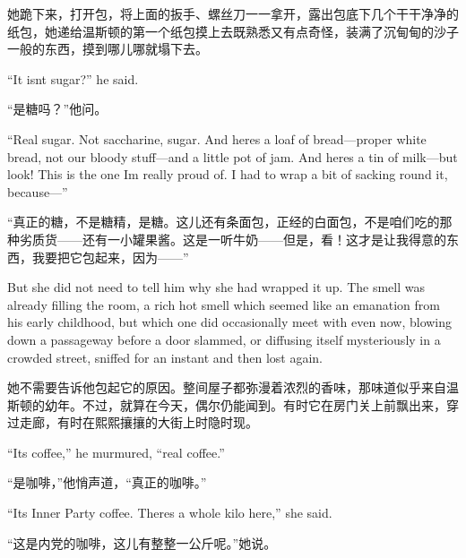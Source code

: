 \begin{paracol}{2}
\switchcolumn

她跪下来，打开包，将上面的扳手、螺丝刀一一拿开，露出包底下几个干干净净的纸包，她递给温斯顿的第一个纸包摸上去既熟悉又有点奇怪，装满了沉甸甸的沙子一般的东西，摸到哪儿哪就塌下去。

\switchcolumn*

``It isn\textquotesingle t sugar?'' he said.

\switchcolumn

``是糖吗？''他问。

\switchcolumn*

``Real sugar. Not saccharine, sugar. And here\textquotesingle s a loaf of
bread---proper white bread, not our bloody stuff---and a little pot of
jam. And here\textquotesingle s a tin of milk---but look! This is the
one I\textquotesingle m really proud of. I had to wrap a bit of sacking
round it, because---''

\switchcolumn

``真正的糖，不是糖精，是糖。这儿还有条面包，正经的白面包，不是咱们吃的那种劣质货——还有一小罐果酱。这是一听牛奶——但是，看！这才是让我得意的东西，我要把它包起来，因为——''

\switchcolumn*

But she did not need to tell him why she had wrapped it up. The smell
was already filling the room, a rich hot smell which seemed like an
emanation from his early childhood, but which one did occasionally meet
with even now, blowing down a passageway before a door slammed, or
diffusing itself mysteriously in a crowded street, sniffed for an
instant and then lost again.

\switchcolumn

她不需要告诉他包起它的原因。整间屋子都弥漫着浓烈的香味，那味道似乎来自温斯顿的幼年。不过，就算在今天，偶尔仍能闻到。有时它在房门关上前飘出来，穿过走廊，有时在熙熙攘攘的大街上时隐时现。

\switchcolumn*

``It\textquotesingle s coffee,'' he murmured, ``real coffee.''

\switchcolumn

``是咖啡，''他悄声道，``真正的咖啡。''

\switchcolumn*

``It\textquotesingle s Inner Party coffee. There\textquotesingle s a
whole kilo here,'' she said.

\switchcolumn

``这是内党的咖啡，这儿有整整一公斤呢。''她说。

\switchcolumn*


\end{paracol}
